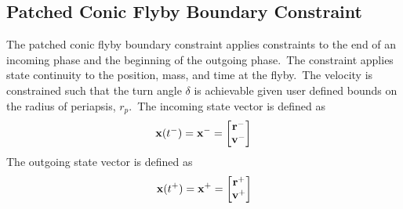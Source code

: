 %
\subsection{Patched Conic Flyby Boundary Constraint}
The patched conic flyby boundary constraint applies constraints to the end of an incoming phase and the beginning of the outgoing phase.~The constraint applies state continuity to the position, mass, and time at the flyby.~The velocity is constrained such that the turn angle $\delta$ is achievable given user defined bounds on the radius of periapsis, $r_p$.~The incoming state vector is defined as
\begin{equation}
   \mathbf{x}(t^-)  =  \mathbf{x}^- =
 \begin{bmatrix}
    \mathbf{r}^-\\
    \mathbf{v}^-\\
 \end{bmatrix}
\end{equation}
%
The outgoing state vector is defined as
%
\begin{equation}
 \mathbf{x}(t^+) =  \mathbf{x}^+=
 \begin{bmatrix}
    \mathbf{r}^+\\
    \mathbf{v}^+\\
 \end{bmatrix}
\end{equation}

